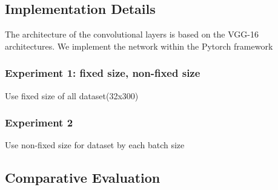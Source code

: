 \documentclass[14pt]{extarticle}
\newcommand{\<}{\langle}
\renewcommand{\>}{\rangle}
\theoremstyle{definition}
\begin{document}
\subsection{Implementation Details}
The architecture of the convolutional layers is based on the VGG-16 architectures.
We implement the network within the Pytorch framework
\subsubsection{Experiment 1: fixed size, non-fixed size}

Use fixed size of all dataset(32x300)
\subsubsection{Experiment 2}
Use non-fixed size for dataset by each batch size 

\subsection{Comparative Evaluation}
\end{document}
